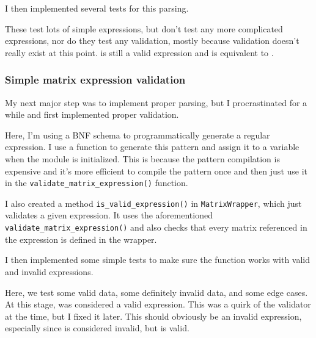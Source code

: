 \documentclass[../development.tex]{subfiles}
\begin{document}
I then implemented several tests for this parsing.



These test lots of simple expressions, but don't test any more complicated expressions, nor do they test any validation, mostly because validation doesn't really exist at this point.  is still a valid expression and is equivalent to .

\subsubsection{Simple matrix expression validation\label{development:matrices-backend:simple-matrix-expression-validation}}

My next major step was to implement proper parsing, but I procrastinated for a while and first implemented proper validation.


Here, I'm using a BNF schema to programmatically generate a regular expression. I use a function to generate this pattern and assign it to a variable when the module is initialized. This is because the pattern compilation is expensive and it's more efficient to compile the pattern once and then just use it in the \texttt{validate_matrix_expression()} function.

I also created a method \texttt{is_valid_expression()} in \texttt{MatrixWrapper}, which just validates a given expression. It uses the aforementioned \texttt{validate_matrix_expression()} and also checks that every matrix referenced in the expression is defined in the wrapper.


I then implemented some simple tests to make sure the function works with valid and invalid expressions.



Here, we test some valid data, some definitely invalid data, and some edge cases. At this stage,  was considered a valid expression. This was a quirk of the validator at the time, but I fixed it later. This should obviously be an invalid expression, especially since  is considered invalid, but  is valid.
\end{document}

